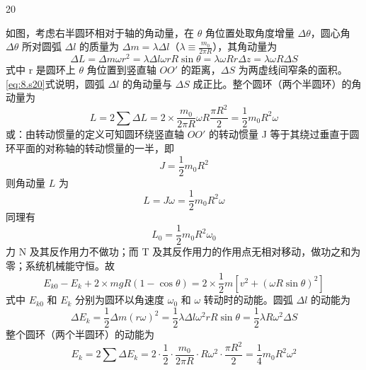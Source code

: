 \begin{solution}{20}
\begin{subsolution}
        如图，考虑右半圆环相对于轴的角动量，在 $\theta$ 角位置处取角度增量 $\Delta\theta$，圆心角 $\Delta\theta$ 所对圆弧 $\Delta l$ 的质量为 $\Delta m = \lambda \Delta l$（$\lambda \equiv \frac{m_0}{2\pi R}$），其角动量为
        \begin{equation}
            \Delta L = \Delta m \omega r^2 = \lambda \Delta l \omega r R \sin\theta = \lambda \omega R r \Delta z = \lambda \omega R \Delta S
            \label{eq:8.s20}
        \end{equation}
        式中 r 是圆环上 $\theta$ 角位置到竖直轴 $OO'$ 的距离，$\Delta S$ 为两虚线间窄条的面积。\eqref{eq:8.s20}式说明，圆弧 $\Delta l$ 的角动量与 $\Delta S$ 成正比。整个圆环（两个半圆环）的角动量为
        \begin{equation}
            L = 2\sum \Delta L = 2 \times \frac{m_0}{2\pi R}\omega R \frac{\pi R^2}{2} = \frac{1}{2}m_0 R^2 \omega
            \label{eq:9.s20}
        \end{equation}
        或：由转动惯量的定义可知圆环绕竖直轴 $OO'$ 的转动惯量 J 等于其绕过垂直于圆环平面的对称轴的转动惯量的一半，即
        \begin{equation*}
            J = \frac{1}{2}m_0 R^2
        \end{equation*}
        则角动量 $L$ 为
        \begin{equation*}
            L = J\omega = \frac{1}{2}m_0 R^2 \omega
        \end{equation*}
        同理有
        \begin{equation}
            L_0 = \frac{1}{2}m_0 R^2 \omega_0
            \label{eq:10.s20}
        \end{equation}
        力 N 及其反作用力不做功；而 T 及其反作用力的作用点无相对移动，做功之和为零；系统机械能守恒。故
        \begin{equation}
            E_{k0} - E_k + 2 \times mgR(1 - \cos\theta) = 2 \times \frac{1}{2}m[v^2 + (\omega R \sin\theta)^2]
            \label{eq:11.s20}
        \end{equation}
        式中 $E_{k0}$ 和 $E_k$ 分别为圆环以角速度 $\omega_0$ 和 $\omega$ 转动时的动能。圆弧 $\Delta l$ 的动能为
        \begin{equation*}
            \Delta E_k = \frac{1}{2}\Delta m (r\omega)^2 = \frac{1}{2}\lambda \Delta l \omega^2 r R \sin\theta = \frac{1}{2}\lambda R \omega^2 \Delta S
        \end{equation*}
        整个圆环（两个半圆环）的动能为
        \begin{equation}
            E_k = 2\sum \Delta E_k = 2 \cdot \frac{1}{2} \cdot \frac{m_0}{2\pi R} \cdot R \omega^2 \cdot \frac{\pi R^2}{2} = \frac{1}{4}m_0 R^2 \omega^2

\end{equation}
\end{subsolution}
\end{solution}
